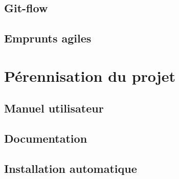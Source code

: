 		\subsection{Git-flow}
		
			
		\subsection{Emprunts agiles}
		
			

	\section{Pérennisation du projet}
	
		\subsection{Manuel utilisateur}
		
			
		\subsection{Documentation}
		
			
		\subsection{Installation automatique}
		
				
